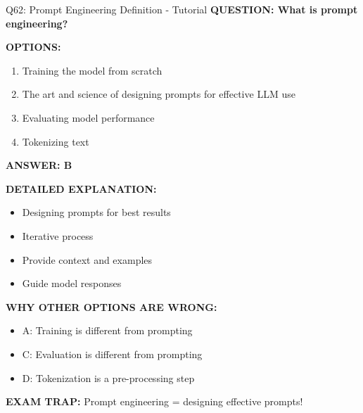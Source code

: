 \documentclass[8pt]{beamer}
\begin{document}
	\begin{frame}{Q62: Prompt Engineering Definition - Tutorial}
		\fontsize{6.5}{7.5}\selectfont
		\textbf{QUESTION: What is prompt engineering?}
		
		\vspace{0.1cm}
		\textbf{OPTIONS:}
		\begin{enumerate}
			\item Training the model from scratch
			\item The art and science of designing prompts for effective LLM use
			\item Evaluating model performance
			\item Tokenizing text
		\end{enumerate}
		
		\vspace{0.1cm}
		\textcolor{myblue}{\textbf{ANSWER: B}}
		
		\vspace{0.1cm}
		\textbf{DETAILED EXPLANATION:}
		\begin{itemize}
			\item Designing prompts for best results
			\item Iterative process
			\item Provide context and examples
			\item Guide model responses
		\end{itemize}
		
		\vspace{0.1cm}
		\textcolor{myred}{\textbf{WHY OTHER OPTIONS ARE WRONG:}}
		\begin{itemize}
			\item \textcolor{myred}{A:} Training is different from prompting
			\item \textcolor{myred}{C:} Evaluation is different from prompting
			\item \textcolor{myred}{D:} Tokenization is a pre-processing step
		\end{itemize}
		
		\textcolor{myred}{\textbf{EXAM TRAP:}} Prompt engineering = \textcolor{myblue}{designing effective prompts}!
	\end{frame}
	
\end{document}
